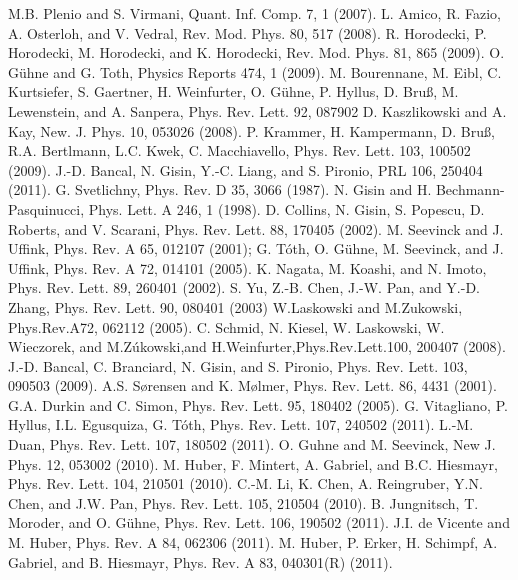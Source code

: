 \begin{thebibliography}{}
 M.B. Plenio and S. Virmani, Quant. Inf. Comp. 7, 1 (2007).
 L. Amico, R. Fazio, A. Osterloh, and V. Vedral, Rev. Mod. Phys. 80, 517 (2008).
 R. Horodecki, P. Horodecki, M. Horodecki, and K. Horodecki, Rev. Mod. Phys. 81, 865 (2009).
 O. G\"uhne and G. Toth, Physics Reports 474, 1 (2009).
 M. Bourennane, M. Eibl, C. Kurtsiefer, S. Gaertner, H. Weinfurter, O. G\"uhne, P. Hyllus, D. Bruß, M. Lewenstein, and A. Sanpera, Phys. Rev. Lett. 92, 087902
 D. Kaszlikowski and A. Kay, New. J. Phys. 10, 053026 (2008).
 P. Krammer, H. Kampermann, D. Bruß, R.A. Bertlmann, L.C. Kwek, C. Macchiavello, Phys. Rev. Lett. 103, 100502 (2009).
 J.-D. Bancal, N. Gisin, Y.-C. Liang, and S. Pironio, PRL 106, 250404 (2011).
 G. Svetlichny, Phys. Rev. D 35, 3066 (1987).
 N. Gisin and H. Bechmann-Pasquinucci, Phys. Lett. A 246, 1 (1998).
 D. Collins, N. Gisin, S. Popescu, D. Roberts, and V. Scarani, Phys. Rev. Lett. 88, 170405 (2002).
 M. Seevinck and J. Uffink, Phys. Rev. A 65, 012107 (2001);
 G. T\'oth, O. G\"uhne, M. Seevinck, and J. Uffink, Phys. Rev. A 72, 014101 (2005).
 K. Nagata, M. Koashi, and N. Imoto, Phys. Rev. Lett. 89, 260401 (2002).
 S. Yu, Z.-B. Chen, J.-W. Pan, and Y.-D. Zhang, Phys. Rev. Lett. 90, 080401 (2003)
 W.Laskowski and M.Zukowski, Phys.Rev.A72, 062112 (2005).
 C. Schmid, N. Kiesel, W. Laskowski, W. Wieczorek, and M.Z\'ukowski,and H.Weinfurter,Phys.Rev.Lett.100, 200407 (2008).
 J.-D. Bancal, C. Branciard, N. Gisin, and S. Pironio, Phys. Rev. Lett. 103, 090503 (2009).
 A.S. Sørensen and K. Mølmer, Phys. Rev. Lett. 86, 4431 (2001).
 G.A. Durkin and C. Simon, Phys. Rev. Lett. 95, 180402 (2005).
 G. Vitagliano, P. Hyllus, I.L. Egusquiza, G. T\'oth, Phys. Rev. Lett. 107, 240502 (2011).
 L.-M. Duan, Phys. Rev. Lett. 107, 180502 (2011).
 O. Guhne and M. Seevinck, New J. Phys. 12, 053002 (2010).
 M. Huber, F. Mintert, A. Gabriel, and B.C. Hiesmayr, Phys. Rev. Lett. 104, 210501 (2010).
 C.-M. Li, K. Chen, A. Reingruber, Y.N. Chen, and J.W. Pan, Phys. Rev. Lett. 105, 210504 (2010).
 B. Jungnitsch, T. Moroder, and O. G\"uhne, Phys. Rev. Lett. 106, 190502 (2011).
 J.I. de Vicente and M. Huber, Phys. Rev. A 84, 062306 (2011).
 M. Huber, P. Erker, H. Schimpf, A. Gabriel, and B. Hiesmayr, Phys. Rev. A 83, 040301(R) (2011).



\end{thebibliography}
